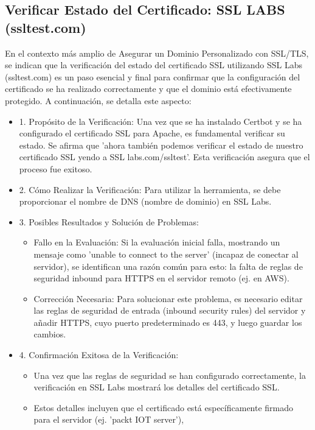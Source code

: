 \documentclass{report}
\begin{document}
\subsection{Verificar Estado del Certificado: SSL LABS (ssltest.com)}
En el contexto más amplio de Asegurar un Dominio Personalizado con SSL/TLS, se  indican que la verificación del estado del 
certificado SSL utilizando SSL Labs (ssltest.com) es un paso esencial y final para confirmar que la configuración del certificado 
se ha realizado correctamente y que el dominio está efectivamente protegido.
A continuación, se detalla este aspecto:
\begin{itemize}
    \item 1. Propósito de la Verificación: Una vez que se ha instalado Certbot y se ha configurado el certificado SSL para Apache, es 
    fundamental verificar su estado. Se afirma que 'ahora también podemos verificar el estado de nuestro certificado SSL yendo 
    a SSL labs.com/ssltest'. Esta verificación asegura que el proceso fue exitoso.
    \item 2. Cómo Realizar la Verificación: Para utilizar la herramienta, se debe proporcionar el nombre de DNS (nombre de dominio) 
    en SSL Labs.
    \item 3. Posibles Resultados y Solución de Problemas:
        \begin{itemize}
            \item Fallo en la Evaluación: Si la evaluación inicial falla, mostrando un mensaje como 'unable to connect to the server' 
            (incapaz de conectar al servidor), se  identifican una razón común para esto: la falta de reglas de seguridad inbound 
            para HTTPS en el servidor remoto (ej. en AWS).
            \item Corrección Necesaria: Para solucionar este problema, es necesario editar las reglas de seguridad de entrada 
            (inbound security rules) del servidor y añadir HTTPS, cuyo puerto predeterminado es 443, y luego guardar los cambios.
        \end{itemize}
    \item 4. Confirmación Exitosa de la Verificación:
        \begin{itemize}
            \item Una vez que las reglas de seguridad se han configurado correctamente, la verificación en SSL Labs mostrará los detalles 
            del certificado SSL.
            \item Estos detalles incluyen que el certificado está específicamente firmado para el servidor (ej. 'packt IOT server'), 

\end{itemize}
\end{itemize}
\end{document}
